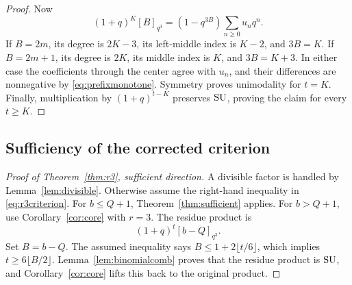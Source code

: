 \documentclass[11pt]{article}
\theoremstyle{research}
\theoremstyle{definition}
\newcommand{\qir}[2]{[#1]_{q^{#2}}}
\newcommand{\SU}{\textup{SU}}
\numberwithin{equation}{section}
\begin{document}
\begin{proof}
Now
\[
 (1+q)^K\qir B3=(1-q^{3B})\sum_{n\ge0}u_nq^n.
\]
If $B=2m$, its degree is $2K-3$, its left-middle index is $K-2$,
and $3B=K$. If $B=2m+1$, its degree is $2K$, its middle index is $K$,
and $3B=K+3$. In either case the coefficients through the center agree
with $u_n$, and their differences are nonnegative by
\eqref{eq:prefixmonotone}. Symmetry proves unimodality for $t=K$.
Finally, multiplication by $(1+q)^{t-K}$ preserves $\SU$, proving the
claim for every $t\ge K$.
\end{proof}

\subsection{Sufficiency of the corrected criterion}
\begin{proof}[Proof of Theorem~\ref{thm:r3}, sufficient direction]
A divisible factor is handled by Lemma~\ref{lem:divisible}.
Otherwise assume the right-hand inequality in \eqref{eq:r3criterion}.
For $b\le Q+1$, Theorem~\ref{thm:sufficient} applies.
For $b>Q+1$, use Corollary~\ref{cor:core} with $r=3$.
The residue product is
\[
 (1+q)^t\qir{b-Q}{3}.
\]
Set $B=b-Q$. The assumed inequality says
$B\le1+2\lfloor t/6\rfloor$, which implies
$t\ge6\lfloor B/2\rfloor$.
Lemma~\ref{lem:binomialcomb} proves that the residue product is $\SU$,
and Corollary~\ref{cor:core} lifts this back to the original product.
\end{proof}
\end{document}
